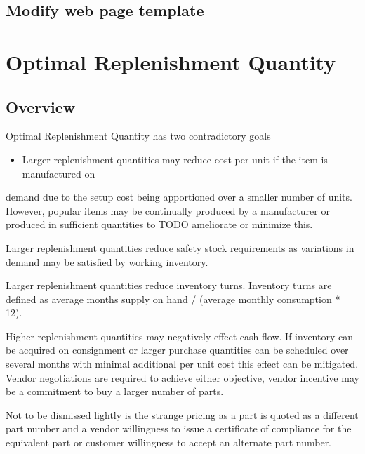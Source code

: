 \documentclass[letterpaper,10pt,english]{sphinxmanual}
\begin{document}
\section{Modify web page template}
\label{\detokenize{IcItemStat:modify-web-page-template}}

\chapter{Optimal Replenishment Quantity}
\label{\detokenize{OptimalReplenishmentQty:optimal-replenishment-quantity}}\label{\detokenize{OptimalReplenishmentQty::doc}}

\section{Overview}
\label{\detokenize{OptimalReplenishmentQty:overview}}
Optimal Replenishment Quantity has two contradictory goals
\begin{itemize}
\item {} 
Larger replenishment quantities may reduce cost per unit if the item is manufactured on

\end{itemize}

demand due to the setup cost being apportioned over a smaller number of units.  However,
popular items may be continually produced by a manufacturer or produced in sufficient
quantities to TODO ameliorate or minimize this.

Larger replenishment quantities reduce safety stock requirements as variations in demand
may be satisfied by working inventory.

Larger replenishment quantities reduce inventory turns.  Inventory turns are defined as
average months supply on hand   / (average monthly consumption * 12).

Higher replenishment quantities may negatively effect cash flow.  If inventory can
be acquired on consignment or larger purchase quantities can be scheduled over several
months with minimal additional per unit cost this effect can be mitigated.  Vendor
negotiations are required to achieve either objective, vendor incentive may be a commitment
to buy a larger number of parts.

Not to be dismissed lightly is the strange pricing as a part is quoted as a different
part number and a vendor willingness to issue a certificate of compliance for the
equivalent part or customer willingness to accept an alternate part number.
\end{document}
